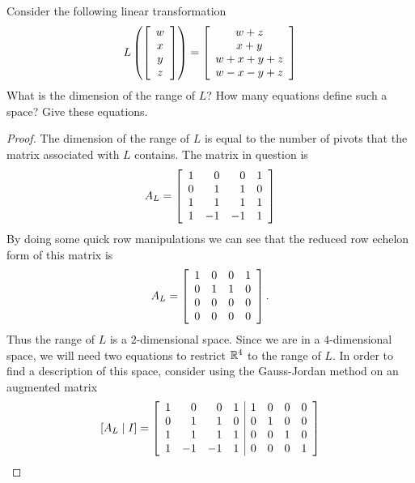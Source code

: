 \documentclass{tutorial}
\begin{document}
\begin{prob} Consider the following linear transformation
\[
  L \left( \left[ \begin{array}{c} w \\ x \\ y \\ z \end{array} \right]\right)
  = \left[ \begin{array}{c}
    w+z \\
    x+y \\
    w+x+y+z \\
    w-x-y+z
  \end{array} \right]
\]
What is the dimension of the range of $L$? How many equations define such a space? Give these equations.
\end{prob} \ifsolns \begin{proof}
The dimension of the range of $L$ is equal to the number of pivots that the matrix associated with $L$ contains. The matrix in question is
\[
  A_L = \left[ \begin{array}{rrrr}
     1 &  0 &  0 &  1 \\
     0 &  1 &  1 &  0 \\
     1 &  1 &  1 &  1 \\
     1 & -1 & -1 &  1
  \end{array} \right]
\]
By doing some quick row manipulations we can see that the reduced row echelon form of this matrix is
\[
  A_L = \left[ \begin{array}{rrrr}
     1 &  0 &  0 &  1 \\
     0 &  1 &  1 &  0 \\
     0 &  0 &  0 &  0 \\
     0 &  0 &  0 &  0
  \end{array} \right] .
\]
Thus the range of $L$ is a $2$-dimensional space. Since we are in a $4$-dimensional space, we will need two equations to restrict $\mathbb{R}^4$ to the range of $L$. In order to find a description of this space, consider using the Gauss-Jordan method on an augmented matrix
\begin{align*}
  \ls A_L \; | \; I \rs
  & = \ls \begin{array}{rrrr|rrrr}
     1 &  0 &  0 &  1 & 1 & 0 & 0 & 0 \\
     0 &  1 &  1 &  0 & 0 & 1 & 0 & 0 \\
     1 &  1 &  1 &  1 & 0 & 0 & 1 & 0 \\
     1 & -1 & -1 &  1 & 0 & 0 & 0 & 1 \\
  \end{array} \rs \\

\end{align*}
\end{proof}
\end{document}

